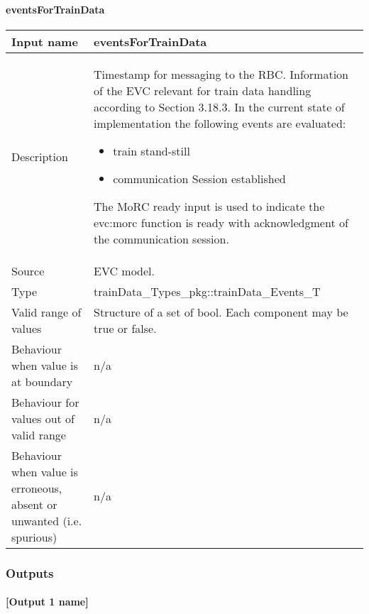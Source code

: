\paragraph{eventsForTrainData}

\begin{longtable}{p{}p{}}
\toprule
Input name				& eventsForTrainData\\
\midrule
Description				& Timestamp for messaging to the RBC. Information of the EVC relevant for train data handling according to Section 3.18.3. In the current state of implementation the following events are evaluated:
\begin{itemize}
\item train stand-still
\item communication Session established
\end{itemize}
The MoRC ready input is used to indicate the evc:morc function is ready with acknowledgment of the communication session.\\
\midrule
Source					& EVC model.\\ 
\midrule
Type					& trainData\_Types\_pkg::trainData\_Events\_T\\
\midrule
Valid range of values	& Structure of a set of bool. Each component may be true or false.\\
\midrule
Behaviour when value is at boundary	& n/a\\
\midrule
Behaviour for values out of valid range	& n/a\\
\midrule
Behaviour when value is erroneous, absent or unwanted (i.e. spurious) & n/a\\

\bottomrule
\end{longtable}

\subsubsection{Outputs}\label{s:traindata_outputs}
\paragraph{[Output 1 name]}

